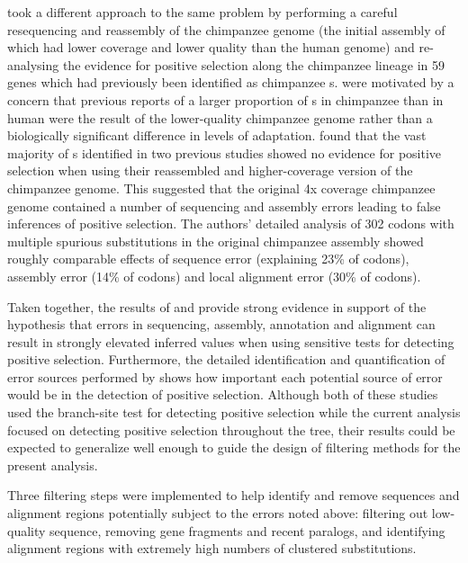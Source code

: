 \citet{Mallick2009} took a different approach to the same problem by
performing a careful resequencing and reassembly of the chimpanzee
genome (the initial assembly of which had lower coverage and lower
quality than the human genome) and re-analysing the evidence for
positive selection along the chimpanzee lineage in 59 genes which had
previously been identified as chimpanzee \psg{}s. \citet{Mallick2009}
were motivated by a concern that previous reports of a larger
proportion of \psg{}s in chimpanzee than in human \citep{Bakewell2007}
were the result of the lower-quality chimpanzee genome rather than a
biologically significant difference in levels of
adaptation. \citet{Mallick2009} found that the vast majority of
\psg{}s identified in two previous studies showed no evidence for
positive selection when using their reassembled and higher-coverage
version of the chimpanzee genome. This suggested that the original 4x
coverage chimpanzee genome contained a number of sequencing and
assembly errors leading to false inferences of positive selection. The
authors' detailed analysis of 302 codons with multiple spurious \nsyn
substitutions in the original chimpanzee assembly showed roughly
comparable effects of sequence error (explaining 23\% of codons),
assembly error (14\% of codons) and local alignment error (30\% of
codons).

Taken together, the results of \citet{Schneider2009} and
\citet{Mallick2009} provide strong evidence in support of the
hypothesis that errors in sequencing, assembly, annotation and
alignment can result in strongly elevated inferred \omg values when
using sensitive tests for detecting positive selection. Furthermore,
the detailed identification and quantification of error sources
performed by \citet{Mallick2009} shows how important each potential
source of error would be in the detection of positive
selection. Although both of these studies used the branch-site test
for detecting positive selection while the current analysis focused on
detecting \sw positive selection throughout the tree, their results
could be expected to generalize well enough to guide the design of
filtering methods for the present \sw analysis.

Three filtering steps were implemented to help identify and remove
sequences and alignment regions potentially subject to the errors
noted above: filtering out low-quality sequence, removing gene
fragments and recent paralogs, and identifying alignment regions with
extremely high numbers of clustered substitutions.

